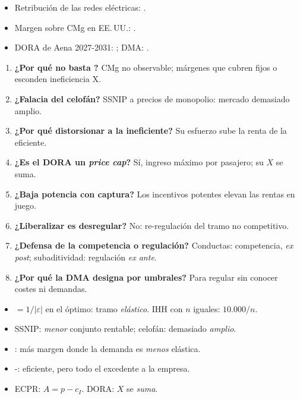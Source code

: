 \documentclass{article}
\begin{document}
\begin{columnas}
\anexorepaso
{}
\begin{itemize}
\item Retribución de las redes eléctricas: .
\item Margen sobre CMg en EE.\,UU.: .
\item DORA de Aena 2027-2031: ; DMA: .
\end{itemize}
\begin{enumerate}
\item \textbf{¿Por qué no basta ?} CMg no observable; márgenes que cubren fijos o esconden ineficiencia X.
\item \textbf{¿Falacia del celofán?} SSNIP a precios de monopolio: mercado demasiado amplio.
\item \textbf{¿Por qué distorsionar a la ineficiente?} Su esfuerzo sube la renta de la eficiente.
\item \textbf{¿Es el DORA un \emph{price cap}?} Sí, ingreso máximo por pasajero; su $X$ se suma.
\item \textbf{¿Baja potencia con captura?} Los incentivos potentes elevan las rentas en juego.
\item \textbf{¿Liberalizar es desregular?} No: re-regulación del tramo no competitivo.
\item \textbf{¿Defensa de la competencia o regulación?} Conductas: competencia, \emph{ex post}; subaditividad: regulación \emph{ex ante}.
\item \textbf{¿Por qué la DMA designa por umbrales?} Para regular sin conocer costes ni demandas.
\end{enumerate}
\begin{trampa}
\begin{itemize}
\item {} $=1/|\varepsilon|$ en el óptimo: tramo \emph{elástico}. IHH con $n$ iguales: $10.000/n$.
\item SSNIP: \emph{menor} conjunto rentable; celofán: demasiado \emph{amplio}.
\item {}: más margen donde la demanda es \emph{menos} elástica.
\item {}-: eficiente, pero todo el excedente a la empresa.
\item ECPR: $A=p-c_I$. DORA: $X$ se \emph{suma}.
\end{itemize}
\end{trampa}

\end{columnas}
\end{document}
